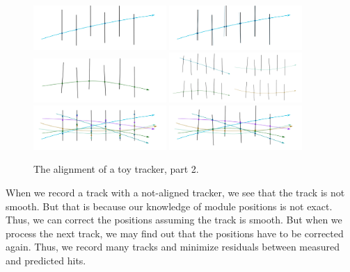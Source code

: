 \begin{figure}[htb]
    \begin{center}
        \includegraphics[width=0.45\textwidth]{../figs/Alignment/toyTracker07.png}
        \includegraphics[width=0.45\textwidth]{../figs/Alignment/toyTracker08.png}
        \includegraphics[width=0.45\textwidth]{../figs/Alignment/toyTracker09.png}
        \includegraphics[width=0.45\textwidth]{../figs/Alignment/toyTracker10.png}
        \includegraphics[width=0.45\textwidth]{../figs/Alignment/toyTracker12.png}
        \includegraphics[width=0.45\textwidth]{../figs/Alignment/toyTracker13.png}
    \end{center}
    \caption{The alignment of a toy tracker, part 2.}
    \label{fig:toyTracker_part2}
\end{figure}


When we record a track with a not-aligned tracker, we see that the track is not smooth. But that is because our knowledge of module positions is not exact. Thus, we can correct the positions assuming the track is smooth. But when we process the next track, we may find out that the positions have to be corrected again. Thus, we record many tracks and minimize residuals between measured and predicted hits.\\

